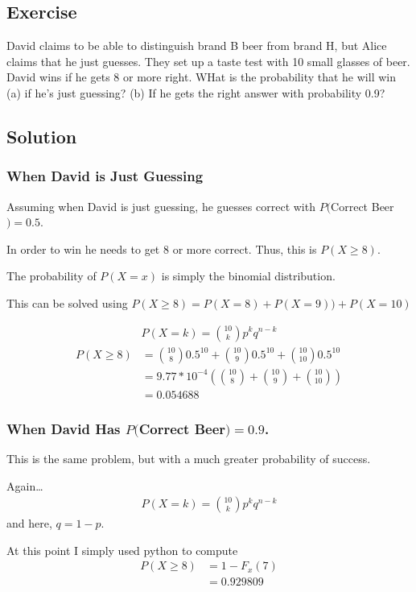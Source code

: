 \documentclass[12pt]{article}
\begin{document}
\subsection{Exercise}
David claims to be able to distinguish brand B beer from brand H, but Alice claims that he just guesses. 
They set up a taste test with 10 small glasses of beer. David wins if he gets 8 or more right. WHat is the probability
that he will win (a) if he's just guessing? (b) If he gets the right answer with probability 0.9?

\subsection{Solution}
\subsubsection{When David is Just Guessing}
Assuming when David is just guessing, he guesses correct with $P($Correct Beer$)= 0.5$.

In order to win he needs to get 8 or more correct. Thus, this is $P(X\geq8)$.

The probability of $P(X=x)$ is simply the binomial distribution.

This can be solved using $P(X\geq8) = P(X=8 ) +P(X=9)) + P(X=10)$

\begin{align*}
  P(X=k)=\binom{10}{k}p^kq^{n-k}
\end{align*}
\begin{align*}
  P(X\geq8)&=\binom{10}{8}0.5^{10} + \binom{10}{9}0.5^{10} + \binom{10}{10}0.5^{10}\\
  &=9.77*10^{-4}\left(\binom{10}{8} + \binom{10}{9} + \binom{10}{10}\right)\\
  &=0.054688
\end{align*}

\subsubsection{When David Has $P($Correct Beer$)= 0.9$.}
This is the same problem, but with a much greater probability of success. 

Again\ldots 
\begin{align*}
  P(X=k)=\binom{10}{k}p^kq^{n-k}
\end{align*}
and here, $q = 1-p$.

At this point I simply used python to compute 
\begin{align*}
  P(X\geq8)&=1-F_x(7)\\
  &=0.929809
\end{align*}
\end{document}

